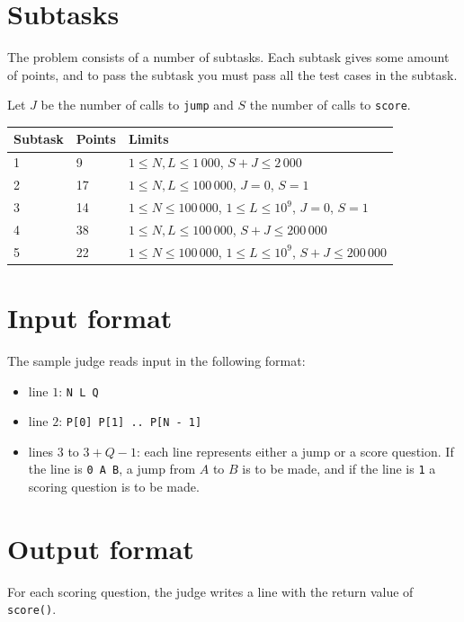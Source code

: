 \section*{Subtasks}
The problem consists of a number of subtasks. Each subtask gives some amount of points, and to pass
the subtask you must pass all the test cases in the subtask.

Let $J$ be the number of calls to \texttt{jump} and $S$ the number of calls to \texttt{score}.

\begin{tabular}{|l|l|l|}
  \hline
  \textbf{Subtask} & \textbf{Points} & \textbf{Limits} \\ \hline
  1 & 9 & $1 \le N, L \le 1\,000$,  $S + J \le 2\,000$ \\ \hline
  2 & 17 & $1 \le N, L \le 100\,000$, $J = 0$, $S = 1$ \\ \hline
  3 & 14 & $1 \le N \le 100\,000$, $1 \le L \le 10^9$, $J = 0$, $S = 1$ \\ \hline
  4 & 38 & $1 \le N, L \le 100\,000$, $S + J \le 200\,000$ \\ \hline
  5 & 22 & $1 \le N \le 100\,000$, $1 \le L \le 10^9$, $S + J \le 200\,000$ \\ \hline
\end{tabular}

\section*{Input format}
The sample judge reads input in the following format:

\begin{itemize}
  \item line $1$: \texttt{N L Q}
  \item line $2$: \texttt{P[0] P[1] .. P[N - 1]}
  \item lines $3$ to $3 + Q - 1$: each line represents either a jump or a score question.
    If the line is \texttt{0 A B}, a jump from $A$ to $B$ is to be made, and if the line is \texttt{1} a scoring question is to be made.
\end{itemize}

\section*{Output format}
For each scoring question, the judge writes a line with the return value of \texttt{score()}.
